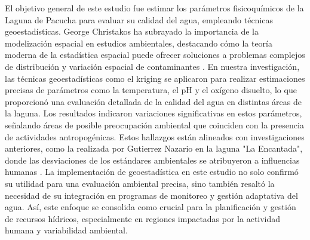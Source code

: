 El objetivo general de este estudio fue estimar los parámetros fisicoquímicos de la Laguna de Pacucha para evaluar su calidad del agua, empleando técnicas geoestadísticas. George Christakos ha subrayado la importancia de la modelización espacial en estudios ambientales, destacando cómo la teoría moderna de la estadística espacial puede ofrecer soluciones a problemas complejos de distribución y variación espacial de contaminantes \cite{Christakos2000}. En nuestra investigación, las técnicas geoestadísticas como el kriging se aplicaron para realizar estimaciones precisas de parámetros como la temperatura, el pH y el oxígeno disuelto, lo que proporcionó una evaluación detallada de la calidad del agua en distintas áreas de la laguna. Los resultados indicaron variaciones significativas en estos parámetros, señalando áreas de posible preocupación ambiental que coinciden con la presencia de actividades antropogénicas. Estos hallazgos están alineados con investigaciones anteriores, como la realizada por Gutierrez Nazario en la laguna "La Encantada", donde las desviaciones de los estándares ambientales se atribuyeron a influencias humanas \cite{GutierrezNazario2023}. La implementación de geoestadística en este estudio no solo confirmó su utilidad para una evaluación ambiental precisa, sino también resaltó la necesidad de su integración en programas de monitoreo y gestión adaptativa del agua. Así, este enfoque se consolida como crucial para la planificación y gestión de recursos hídricos, especialmente en regiones impactadas por la actividad humana y variabilidad ambiental.


